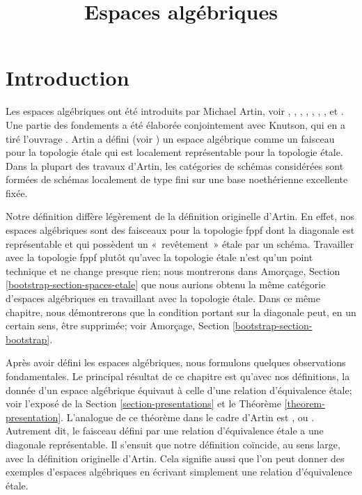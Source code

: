 

%


\title{Espaces algébriques}


\maketitle

\label{section-phantom}

\tableofcontents

\section{Introduction}
\label{section-introduction}

\noindent
Les espaces algébriques ont été introduits par Michael Artin,
voir \cite{ArtinI}, \cite{ArtinII},
\cite{Artin-Theorem-Representability},
\cite{Artin-Construction-Techniques},
\cite{Artin-Algebraic-Spaces},
\cite{Artin-Algebraic-Approximation},
\cite{Artin-Implicit-Function},
et \cite{ArtinVersal}.
Une partie des fondements a été élaborée conjointement avec
Knutson, qui en a tiré l'ouvrage \cite{Kn}.
Artin a défini (voir \cite[Definition 1.3]{Artin-Implicit-Function})
un espace algébrique comme un faisceau pour la topologie étale
qui est localement représentable pour la topologie étale.
Dans la plupart des travaux d'Artin, les catégories de schémas
considérées sont formées de schémas localement de type fini sur une base
noethérienne excellente fixée.

\medskip\noindent
Notre définition diffère légèrement de la définition originelle d'Artin.
En effet, nos espaces algébriques sont des faisceaux pour la topologie fppf
dont la diagonale est représentable et qui possèdent un «~revêtement~» étale
par un schéma. Travailler avec la topologie fppf plutôt qu'avec la topologie
étale n'est qu'un point technique et ne change presque
rien; nous montrerons dans
Amorçage, Section \ref{bootstrap-section-spaces-etale}
que nous aurions obtenu la même catégorie d'espaces algébriques
en travaillant avec la topologie étale. Dans ce même chapitre,
nous démontrerons que la condition portant sur la diagonale
peut, en un certain sens, être supprimée; voir
Amorçage, Section \ref{bootstrap-section-bootstrap}.

\medskip\noindent
Après avoir défini les espaces algébriques, nous formulons quelques
observations fondamentales. Le principal résultat de ce chapitre est qu'avec
nos définitions, la donnée d'un espace algébrique équivaut à celle d'une
relation d'équivalence étale; voir l'exposé de la Section
\ref{section-presentations} et le Théorème \ref{theorem-presentation}.
L'analogue de ce théorème dans le cadre d'Artin est \cite[Theorem 1.5]{Artin-Implicit-Function}, ou
\cite[Proposition II.1.7]{Kn}. Autrement dit, le faisceau
défini par une relation d'équivalence étale a une diagonale représentable.
Il s'ensuit que notre définition coïncide, au sens large, avec la définition
originelle d'Artin. Cela signifie aussi que l'on peut donner des exemples
d'espaces algébriques en écrivant simplement une relation d'équivalence étale.

